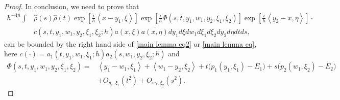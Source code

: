 \documentclass[12pt,reqno]{amsart}
\numberwithin{equation}{section}
\begin{document}
\begin{proof}


In conclusion, we need to prove that
\begin{align}\label{main kernel}
h^{- 4n}\int &\hat{\rho}(s)\hat{\rho}(t) \exp[\frac{i}h \left<x-y_1, \xi\right>] \exp[\frac{i}h \Phi(s,t,y_1, w_1, y_2, \xi_1, \xi_2)]\exp[\frac{i}h \left<y_2-x, \eta\right>]\cdot  \nonumber \\
& c(s,t,y_1,w_1,y_2,\xi_1,\xi_2;h) a(x, \xi) \overline{a(x, \eta)} dy_1 d\xi dw_1 d\xi_1 d\xi_2 dy_2 d\eta dt ds,
\end{align}
can be bounded by the right hand side of \eqref{main lemma eq2} or \eqref{main lemma eq}, here $c(\cdot)=a_1(t, y_1,w_1,\xi_1;h) a_2(s,w_1,y_2,\xi_2;h) $ and
\begin{align*}
\Phi(s,t,y_1,w_1,y_2,\xi_1, \xi_2)=&\left<y_1-w_1,\xi_1 \right>+\left<w_1-y_2, \xi_2\right> +t\big(p_1(y_1,\xi_1)-E_1\big)+s\big( p_2(w_1,\xi_2)-E_2 \big)\nonumber \\
&+O_{y_1,\xi_1}(t^2)+O_{w_1,\xi_2}(s^2).
\end{align*}


\end{proof}
\end{document}

